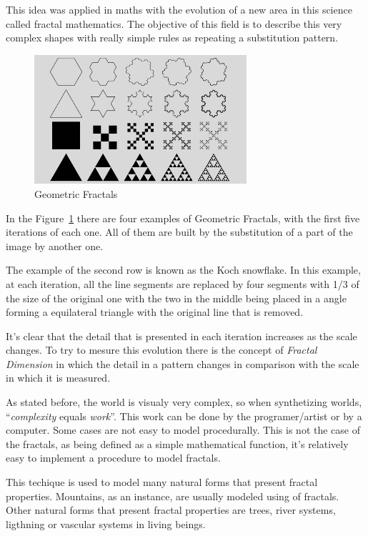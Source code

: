 This idea was applied in maths with the evolution of a new area in this science called fractal mathematics. The objective of this field is to describe this very complex shapes with really simple rules as repeating a substitution pattern. 

\begin{figure}[htbp]
	\centering
	\includegraphics[width=0.7\textwidth]{img/Theory/Fractals/Fractal1_1000.png}
	\caption{Geometric Fractals}
	\label{fig:GFractals}
\end{figure}

In the Figure~\ref{fig:GFractals} there are four examples of Geometric Fractals, with the first five iterations of each one. All of them are built by the substitution of a part of the image by another one. 

The example of the second row is known as the Koch snowflake. In this example, at each iteration, all the line segments are replaced by four segments with 1/3 of the size of the original one with the two in the middle being placed in a angle forming a equilateral triangle with the original line that is removed.

It's clear that the detail that is presented in each iteration increases as the scale changes. To try to mesure this evolution there is the concept of \emph{Fractal Dimension} in which the detail in a pattern changes in comparison with the scale in which it is measured.

As stated before, the world is visualy very complex, so when synthetizing worlds, ``\emph{complexity} equals \emph{work}''\cite{Ebert2002}. This work can be done by the programer/artist or by a computer. Some cases are not easy to model procedurally. This is not the case of the fractals, as being defined as a simple mathematical function, it's relatively easy to implement a procedure to model fractals. 

This techique is used to model many natural forms that present fractal properties. Mountains, as an instance, are usually modeled using of fractals. Other natural forms that present fractal properties are trees, river systems, ligthning or vascular systems in living beings.




